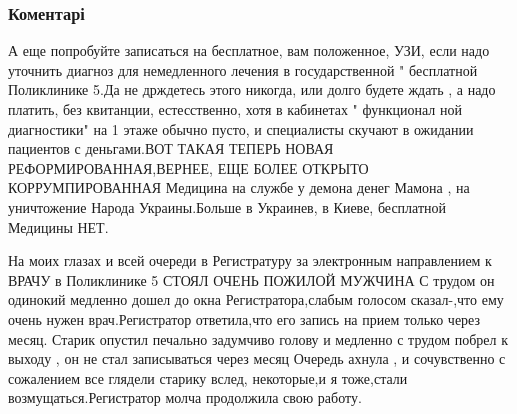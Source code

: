  
 
 
 
 
\subsubsection{Коментарі}

\begin{itemize}

А еще попробуйте записаться на бесплатное, вам положенное, УЗИ, если надо
уточнить диагноз для немедленного лечения в государственной " бесплатной
Поликлинике 5.Да не држдетесь этого никогда, или долго будете ждать , а надо
платить, без квитанции, естесственно, хотя в кабинетах " функционал ной
диагностики" на 1 этаже обычно пусто, и специалисты скучают в ожидании
пациентов с деньгами.ВОТ ТАКАЯ ТЕПЕРЬ НОВАЯ РЕФОРМИРОВАННАЯ,ВЕРНЕЕ, ЕЩЕ БОЛЕЕ
ОТКРЫТО КОРРУМПИРОВАННАЯ Медицина на службе у демона денег Мамона , на
уничтожение Народа Украины.Больше в Украинев, в Киеве, бесплатной Медицины НЕТ.


На моих глазах и всей очереди в Регистратуру за электронным направлением к
ВРАЧУ в Поликлинике 5 СТОЯЛ ОЧЕНЬ ПОЖИЛОЙ МУЖЧИНА С трудом он одинокий медленно
дошел до окна Регистратора,слабым голосом сказал-,что ему очень нужен
врач.Регистратор ответила,что его запись на прием только через месяц. Старик
опустил печально задумчиво голову и медленно с трудом побрел к выходу , он не
стал записываться через месяц Очередь ахнула , и сочувственно с сожалением все
глядели старику вслед, некоторые,и я тоже,стали возмущаться.Регистратор молча
продолжила свою работу.

\end{itemize}

